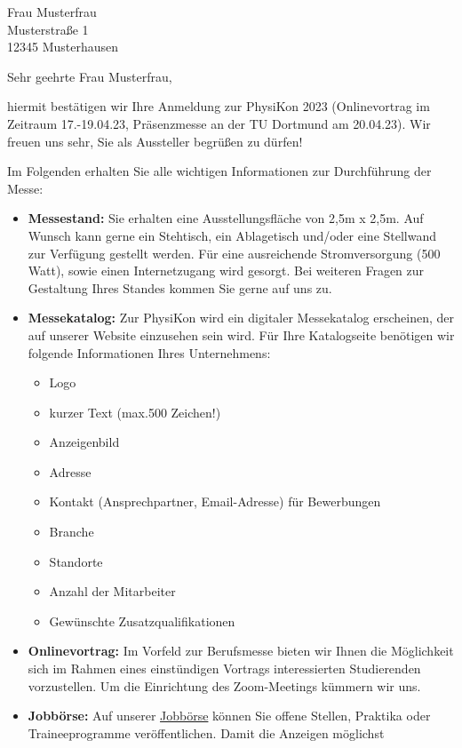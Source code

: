 \documentclass[
  pepbrief,
  fontsize=12pt,
  paper=a4,
  DIV=14,
  parskip=half,
  backaddress=false,
]{scrlttr2}
\author{Netter PhysiKon Helfer}
\begin{document}
\begin{letter}{%
  Frau Musterfrau \\
  Musterstraße 1 \\
  12345 Musterhausen
}
\opening{Sehr geehrte Frau Musterfrau,}
hiermit bestätigen wir Ihre Anmeldung zur PhysiKon 2023 (Onlinevortrag im Zeitraum 17.-19.04.23, 
Präsenzmesse an der TU Dortmund am 20.04.23). 
Wir freuen uns sehr, Sie als Aussteller begrüßen zu dürfen!

Im Folgenden erhalten Sie alle wichtigen Informationen zur Durchführung der Messe:

\begin{itemize}
  \item \textbf{Messestand:} Sie erhalten eine Ausstellungsfläche von 2,5m x 2,5m.
    Auf Wunsch kann gerne ein Stehtisch, ein Ablagetisch und/oder eine Stellwand 
    zur Verfügung gestellt werden.
    Für eine ausreichende Stromversorgung (500 Watt), sowie einen Internetzugang wird gesorgt.
    Bei weiteren Fragen zur Gestaltung Ihres Standes kommen Sie gerne auf uns zu.
    \item \textbf{Messekatalog:} Zur PhysiKon wird ein digitaler Messekatalog erscheinen, der auf unserer Website 
    einzusehen sein wird.
    Für Ihre Katalogseite benötigen wir folgende Informationen Ihres Unternehmens:
    \begin{itemize}
      \item Logo
      \item kurzer Text (max.500 Zeichen!)
      \item Anzeigenbild 
      \item Adresse
      \item Kontakt (Ansprechpartner, Email-Adresse) für Bewerbungen
      \item Branche
      \item Standorte
      \item Anzahl der Mitarbeiter
      \item Gewünschte Zusatzqualifikationen
    \end{itemize}
    \item \textbf{Onlinevortrag:} Im Vorfeld zur Berufsmesse bieten wir Ihnen die Möglichkeit sich im Rahmen eines einstündigen Vortrags interessierten
    Studierenden vorzustellen. Um die Einrichtung des Zoom-Meetings kümmern wir uns. 
    \item \textbf{Jobbörse:} Auf unserer \href{https://pep-dortmund.org/jobboerse/}{Jobbörse} können 
    Sie offene Stellen, Praktika oder Traineeprogramme veröffentlichen. Damit die Anzeigen möglichst 

\end{itemize}
\end{letter}
\end{document}
